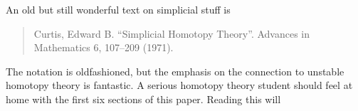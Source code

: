 \documentclass[draft=false, leqno]{article}
\begin{document}
An old but still wonderful text on simplicial stuff is
\begin{quotation}
  Curtis, Edward B. \enquote{Simplicial Homotopy Theory}. Advances in Mathematics 6, 107--209 (1971).
\end{quotation}
The notation is oldfashioned, but the emphasis on the connection to unstable homotopy theory is fantastic.
A serious homotopy theory student should feel at home with the first six sections of this paper.
Reading this will  

\setcounter{tocdepth}{2}
\tableofcontents


\newpage

\printbibliography[keyword=alph, heading=references]
\printbibliography[heading=none, notkeyword=alph]
\end{document}
